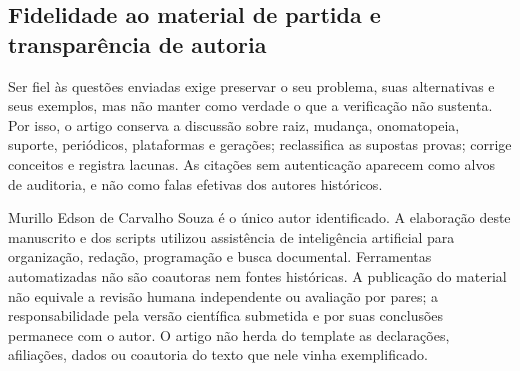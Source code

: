 \subsection{Fidelidade ao material de partida e transparência de autoria}
Ser fiel às questões enviadas exige preservar o seu problema, suas alternativas e seus exemplos, mas não manter como verdade o que a verificação não sustenta. Por isso, o artigo conserva a discussão sobre raiz, mudança, onomatopeia, suporte, periódicos, plataformas e gerações; reclassifica as supostas provas; corrige conceitos e registra lacunas. As citações sem autenticação aparecem como alvos de auditoria, e não como falas efetivas dos autores históricos.

Murillo Edson de Carvalho Souza é o único autor identificado. A elaboração deste manuscrito e dos scripts utilizou assistência de inteligência artificial para organização, redação, programação e busca documental. Ferramentas automatizadas não são coautoras nem fontes históricas. A publicação do material não equivale a revisão humana independente ou avaliação por pares; a responsabilidade pela versão científica submetida e por suas conclusões permanece com o autor. O artigo não herda do template as declarações, afiliações, dados ou coautoria do texto que nele vinha exemplificado.
